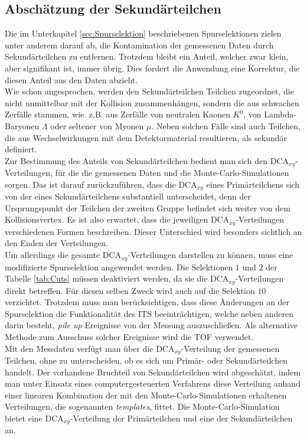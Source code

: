 \documentclass[12pt,a4paper]{report}
\begin{document}
\subsection{Abschätzung der Sekundärteilchen}
Die im Unterkapitel \ref{sec:Spurselektion} beschriebenen Spurselektionen zielen unter anderem darauf ab, die Kontamination der gemessenen Daten durch Sekundärteilchen zu entfernen. Trotzdem bleibt ein Anteil, welcher zwar klein, aber signifikant ist, immer übrig. Dies fordert die Anwendung eine Korrektur, die diesen Anteil aus den Daten abzieht.\\
Wie schon angesprochen, werden den Sekundärteilchen Teilchen zugeordnet, die nicht unmittelbar mit der Kollision zusammenhängen, sondern die aus schwachen Zerfälle stammen, wie. z.B. aus Zerfälle von neutralen Kaonen $K^{0}$, von Lambda-Baryonen $\Lambda$ oder seltener von Myonen $\mu$. Neben solchen Fälle sind auch Teilchen, die aus Wechselwirkungen mit dem Detektormaterial resultieren, als sekundär definiert.\\
Zur Bestimmung des Anteils von Sekundärteilchen bedient man sich den $\mathrm{DCA}_{xy}$-Verteilungen, für die die gemessenen Daten und die Monte-Carlo-Simulationen sorgen. Das ist darauf zurückzuführen, dass die $\mathrm{DCA}_{xy}$ eines Primärteilchens sich von der eines Sekundärteilchens substantiell unterscheidet, denn der Ursprungspunkt der Teilchen der zweiten Gruppe befindet sich weiter von dem Kollisionsvertex. Es ist also erwartet, dass die jeweiligen $\mathrm{DCA}_{xy}$-Verteilungen verschiedenen Formen beschreiben. Dieser Unterschied wird besonders sichtlich an den Enden der Verteilungen.\\
Um allerdings die gesamte $\mathrm{DCA}_{xy}$-Verteilungen darstellen zu können, muss eine modifizierte Spurselektion angewendet werden. Die Selektionen $1$ und $2$ der Tabelle \ref{tab:Cuts} müssen deaktiviert werden, da sie die $\mathrm{DCA}_{xy}$-Verteilungen direkt betreffen. Für diesen selben Zweck wird auch auf die Selektion $10$ verzichtet. Trotzdem muss man berücksichtigen, dass diese Änderungen an der Spurselektion die Funktionalität des ITS beeinträchtigen, welche neben anderen darin besteht, \textit{pile up} Ereignisse von der Messung auszuschließen. Als alternative Methode zum Ausschuss solcher Ereignisse wird die TOF verwendet.\\
Mit den Messdaten verfügt man über die $\mathrm{DCA}_{xy}$-Verteilung der gemessenen Teilchen, ohne zu unterscheiden, ob es sich um Primär- oder Sekundärteilchen handelt. Der vorhandene Bruchteil von Sekundärteilchen wird abgeschätzt, indem man unter Einsatz eines computergesteuerten Verfahrens diese Verteilung anhand einer linearen Kombination der mit den Monte-Carlo-Simulationen erhaltenen Verteilungen, die sogenannten \textit{templates}, fittet. Die Monte-Carlo-Simulation bietet eine $\mathrm{DCA}_{xy}$-Verteilung der Primärteilchen und eine der Sekundärteilchen an.\\
\end{document}
